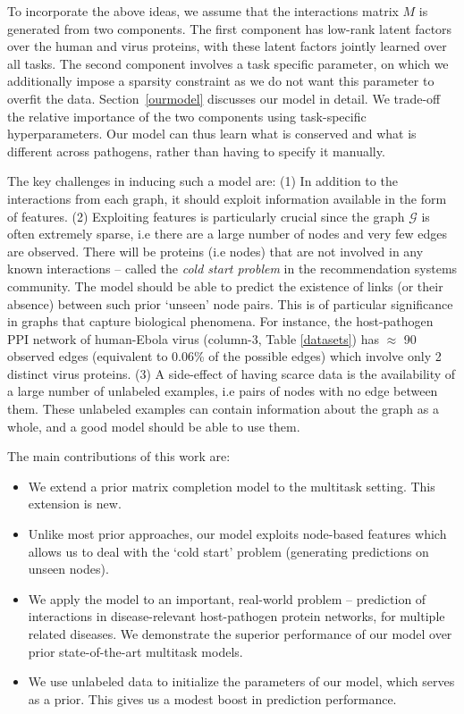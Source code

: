 \documentclass{bioinfo}
\begin{document}
To incorporate the above ideas, we assume that the interactions matrix $M$ is generated from two components. 
The first component has low-rank latent factors over the human and virus proteins,
with these latent factors jointly learned over all tasks. The second component involves a task specific parameter, on which we
additionally impose a sparsity constraint as we do not want this parameter to overfit the data. Section~\ref{ourmodel} discusses
our model in detail. We trade-off the relative importance of the two components using task-specific hyperparameters.
Our model can thus learn what is conserved and what is different across pathogens, rather than having to specify it manually. 

The key challenges in inducing such a model are: (1) In addition to the interactions from each graph, it should exploit information available in the form of features. 
(2) Exploiting features is particularly crucial since the graph $\mathcal{G}$ is often extremely sparse, i.e there are a large number of nodes and very few edges are observed. 
There will be proteins (i.e nodes) that are not involved in any known interactions -- called the \textit{cold start problem} in the recommendation systems community. 
The model should be able to predict the existence of links (or their absence) between such prior `unseen' node pairs. 
This is of particular significance in graphs that capture biological phenomena. For instance, the host-pathogen PPI network
of human-Ebola virus (column-3, Table \ref{datasets}) has $\approx$ 90 observed edges (equivalent to 0.06\% of the possible edges) which involve only 2 distinct virus proteins. 
(3) A side-effect of having scarce data is the availability of a large number of unlabeled examples, 
i.e pairs of nodes with no edge between them. 
These unlabeled examples can contain information about the graph as a whole, and a good model should be able to use them.

The main contributions of this work are:
\begin{itemize}
\item We extend a prior matrix completion model \citep{abernethy} to the multitask setting. This extension is new.
\item Unlike most prior approaches, our model exploits node-based features which allows us to deal with the `cold start' problem (generating predictions on unseen nodes).
\item We apply the model to an important, real-world problem -- prediction of interactions in disease-relevant host-pathogen protein networks, for multiple related diseases. We demonstrate the superior performance of our model over prior state-of-the-art multitask models.
\item We use unlabeled data to initialize the parameters of our model, which serves as a prior. This gives us a modest boost in prediction performance.
\end{itemize}
\end{document}
